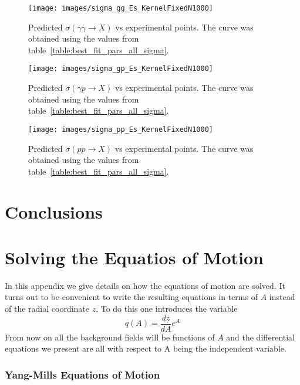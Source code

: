 \documentclass[a4paper,12pt]{article}
\begin{document}
\begin{figure}[!t]
  \center
  \texttt{[image: images/sigma\_gg\_Es\_KernelFixedN1000]} 
  \caption{Predicted $\sigma \left( \gamma \gamma \rightarrow X \right)$ vs experimental points. The curve was obtained using the values from table~\ref{table:best_fit_pars_all_sigma}.}
  \label{fig:sigma_gg}
\end{figure}
\begin{figure}[!t]
  \center
  \texttt{[image: images/sigma\_gp\_Es\_KernelFixedN1000]} 
  \caption{Predicted $\sigma \left( \gamma p \rightarrow X \right)$ vs experimental points. The curve was obtained using the values from table~\ref{table:best_fit_pars_all_sigma}.}
  \label{fig:sigma_gp}
\end{figure}
\begin{figure}[!t]
  \center
  \texttt{[image: images/sigma\_pp\_Es\_KernelFixedN1000]} 
  \caption{Predicted $\sigma \left( p p \rightarrow X \right)$ vs experimental points. The curve was obtained using the values from table~\ref{table:best_fit_pars_all_sigma}.}
  \label{fig:sigma_pp}
\end{figure}

\section{Conclusions}


\appendix

\section{Solving the Equatios of Motion}
\label{appendix:eom_sol}

In this appendix we give details on how the equations of motion are solved. It turns out to be convenient to write the resulting equations in terms of $A$ instead of the radial coordinate $z$. To do this one introduces the variable
\begin{equation}
q\left(A\right) = \frac{dz}{dA} e^{A}
\label{eq: q definition}
\end{equation}
From now on all the background fields will be functions of $A$ and the differential equations we present are all with respect to A being the independent variable.

\subsubsection*{Yang-Mills Equations of Motion}
\end{document}
